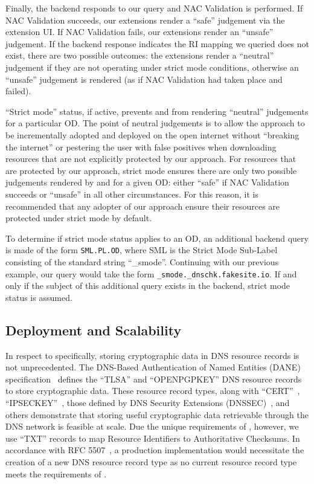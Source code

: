 Finally, the backend responds to our query and NAC Validation is performed. If
NAC Validation succeeds, our extensions render a ``safe'' judgement via the
extension UI. If NAC Validation fails, our extensions render an ``unsafe''
judgement. If the backend response indicates the RI mapping we queried does not
exist, there are two possible outcomes: the extensions render a ``neutral''
judgement if they are not operating under strict mode conditions, otherwise an
``unsafe'' judgement is rendered (as if NAC Validation had taken place and
failed).

``Strict mode'' status, if active, prevents \DNSSYS{} and \DHTSYS{} from
rendering ``neutral'' judgements for a particular OD. The point of neutral
judgements is to allow the \SYSTEM{} approach to be incrementally adopted and
deployed on the open internet without ``breaking the internet'' or pestering the
user with false positives when downloading resources that are not explicitly
protected by our approach. For resources that are protected by our approach,
strict mode ensures there are only two possible judgements rendered by \DNSSYS{}
and \DHTSYS{} for a given OD: either ``safe'' if NAC Validation succeeds or
``unsafe'' in all other circumstances. For this reason, it is recommended that
any adopter of our approach ensure their resources are protected under strict
mode by default.

To determine if strict mode status applies to an OD, an additional backend query
is made of the form \texttt{SML.PL.OD}, where SML is the Strict Mode Sub-Label
consisting of the standard string ``\_smode''. Continuing with our previous
example, our query would take the form \texttt{\_smode.\_dnschk.fakesite.io}. If
and only if the subject of this additional query exists in the backend, strict
mode status is assumed.

\subsection{Deployment and Scalability}


In respect to \DNSSYS{} specifically, storing cryptographic data in DNS resource
records is not unprecedented. The DNS-Based Authentication of Named Entities
(DANE) specification~\cite{DANE1, DANE2, DANE3} defines the ``TLSA'' and
``OPENPGPKEY'' DNS resource records to store cryptographic data. These resource
record types, along with ``CERT''~\cite{CERT}, ``IPSECKEY''~\cite{IPSECKEY},
those defined by DNS Security Extensions (DNSSEC)~\cite{DNSSEC}, and others
demonstrate that storing useful cryptographic data retrievable through the DNS
network is feasible at scale. Due the unique requirements of \DNSSYS{}, however,
we use ``TXT'' records to map Resource Identifiers to Authoritative Checksums.
In accordance with RFC 5507~\cite{RFC5507}, a production \DNSSYS{}
implementation would necessitate the creation of a new DNS resource record type
as no current resource record type meets the requirements of \DNSSYS{}.

